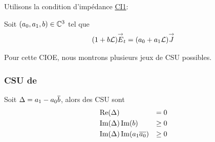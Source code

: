     Utilisons la condition d’impédance \hyperlink{ci1}{CI1}:

    Soit \((a_0, a_1,b) \in \mathbb C^3\) tel que
    \begin{align*}
      (1 + b \mathcal{L}) {\overset{\rightarrow}{E}}_t = (a_0 + a_1 \mathcal{L}) {\overset{\rightarrow}{J}}
    \end{align*}

    Pour cette CIOE, nous montrons plusieurs jeux de CSU possibles.

    \subsubsection{CSU de \cite{stupfel_sufficient_2011}}

      \begin{prop}
        Soit \(\Delta = a_1 - a_0{\overline{b}}\), alors des CSU sont
        \begin{align}
          &\operatorname{Re}(\Delta) &= 0\\
          &\operatorname{Im}(\Delta)\operatorname{Im}(b) &\ge 0\\
          &\operatorname{Im}(\Delta)\operatorname{Im}(a_1{\overline{a_0}})&\ge 0
        \end{align}
      \end{prop}

